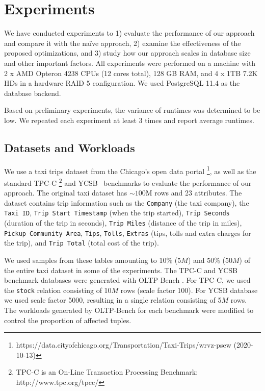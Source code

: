 \section{Experiments}
\label{sec:experiments}



\newcommand{\mn}{\textit{N}\xspace}
\newcommand{\mr}{\textit{R}\xspace}
\newcommand{\mrd}{\textit{R+DS}\xspace}
\newcommand{\mrp}{\textit{R+PS}\xspace}
\newcommand{\mrdp}{\textit{R+PS+DS}\xspace}



We have conducted experiments to 1) evaluate the performance of our approach and compare it with the naïve approach, 2) examine the effectiveness of the proposed optimizations, and 3) study how our approach scales in database size and 
other important factors.
All experiments were performed on a machine with 2 x AMD Opteron 4238 CPUs (12 cores total), 128 GB RAM, and 4 x 1TB 7.2K
HDs in a hardware RAID 5 configuration. We used PostgreSQL 11.4 as the database backend.

Based on preliminary experiments, the variance of runtimes was determined to be low. We repeated each experiment at least 3 times and report average runtimes.


\subsection{Datasets and Workloads}\label{sec:exp-data-and-workloads}

We use a taxi trips dataset from the Chicago's open data portal \footnote{https://data.cityofchicago.org/Transportation/Taxi-Trips/wrvz-psew (2020-10-13)}, as well as the standard TPC-C \footnote{TPC-C is an On-Line Transaction Processing Benchmark: http://www.tpc.org/tpcc/} and YCSB~\cite{CooperSTRS10} benchmarks to evaluate the performance of our approach. 
The original taxi dataset has $\sim100$M rows and 23 attributes.
The dataset contains trip information such as the \texttt{Company} (the taxi company), the \texttt{Taxi ID}, \texttt{Trip Start Timestamp}
(when the trip started), \texttt{Trip Seconds} (duration of the trip in seconds), \texttt{Trip Miles}
(distance of the trip in miles), \texttt{Pickup Community Area}, \texttt{Tips}, \texttt{Tolls}, \texttt{Extras} (tips, tolls and extra charges for the trip), and \texttt{Trip Total} (total cost of the trip).


We used samples from these tables amounting to 10\% ($5M$) and 50\% ($50M$) of the entire taxi dataset in some of the experiments. The TPC-C and YCSB benchmark databases were generated with OLTP-Bench \cite{DifallahPCC13}. For TPC-C, we used  the \texttt{stock} relation consisting of 10$M$ rows (scale factor 100).
 For YCSB database we used scale factor 5000, resulting in a single relation consisting of 5$M$ rows. The workloads generated by OLTP-Bench for each benchmark were modified to control the proportion of affected tuples.


